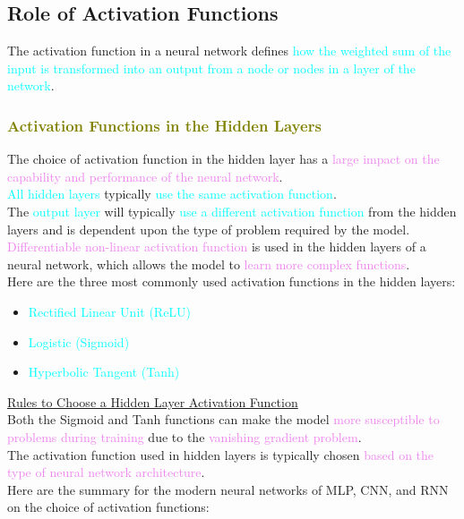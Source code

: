 \documentclass{book}
\begin{document}
\subsection{Role of Activation Functions}
The activation function in a neural network defines \textcolor{cyan}{how the weighted sum of the input is transformed into an output from a node or nodes in a layer of the network}.\\
\textcolor{olive}{\subsubsection{Activation Functions in the Hidden Layers}}
The choice of activation function in the hidden layer has a \textcolor{violet}{large impact on the capability and performance of the neural network}.\\
\textcolor{cyan}{All hidden layers} typically \textcolor{cyan}{use the same activation function}.\\
The \textcolor{cyan}{output layer} will typically \textcolor{cyan}{use a different activation function} from the hidden layers and is dependent upon the type of problem required by the model.\\
\textcolor{violet}{Differentiable non-linear activation function} is used in the hidden layers of a neural network, which allows the model to \textcolor{violet}{learn more complex functions}.\\
Here are the three most commonly used activation functions in the hidden layers:
\begin{itemize}
    \item \textcolor{cyan}{Rectified Linear Unit (ReLU)}
    \item \textcolor{cyan}{Logistic (Sigmoid)}
    \item \textcolor{cyan}{Hyperbolic Tangent (Tanh)}
\end{itemize}
\vspace{2mm}
\uline{Rules to Choose a Hidden Layer Activation Function}\\
\vspace{1mm}
Both the Sigmoid and Tanh functions can make the model \textcolor{violet}{more susceptible to problems during training} due to the \textcolor{violet}{vanishing gradient problem}.\\
The activation function used in hidden layers is typically chosen \textcolor{violet}{based on the type of neural network architecture}.\\
Here are the summary for the modern neural networks of MLP, CNN, and RNN on the choice of activation functions:
\end{document}
